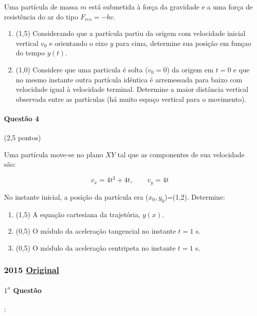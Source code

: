 \documentclass[12pt,a4paper]{article}
\newcommand{\original}[1]{\tiny \href{#1}{Original} \normalsize}
\begin{document}
Uma partícula de massa $m$ está submetida à força da gravidade e a uma força de resistência do ar do tipo $F_{res}=-bv$.

\begin{enumerate}[label=(\alph*)]

\item (1,5) Considerando que a partícula partiu da origem com velocidade inicial vertical $v_0$ e orientando o eixo $y$ para cima, determine sua posição em funçao do tempo $y(t)$.

\item (1,0) Considere que uma particula é solta ($v_0=0$) da origem em $t=0$ e que no mesmo instante outra partícula idêntica é arremessada para baixo com velocidade igual à velocidade terminal. Determine a maior distância vertical observada entre as partículas (há muito espaço vertical para o movimento).

\end{enumerate}

\paragraph{Questão 4} (2,5 pontos)

Uma partícula move-se no plano $XY$ tal que as componentes de sua velocidade são:

$$v_x=4t^3+4t,\qquad v_y=4t$$

No instante inicial, a posição da partícula era ($x_0,y_0$)=(1,2). Determine:

\begin{enumerate}[label=(\alph*)]

\item (1,5) A equação cartesiana da trajetória, $y(x)$.

\item (0,5) O módulo da aceleração tangencial no instante $t=1$ s.

\item (0,5) O módulo da aceleração centripeta no instante $t=1$ s.

\end{enumerate}
\newpage
\subsubsection{2015 \original{https://drive.google.com/file/d/1HRjfX3TmF9oLu2CmCn0ySnKPe9LkM5U7/view?usp=sharing}}

\paragraph{$1^a$ Questão}:
\end{document}
